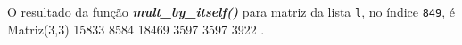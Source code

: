 \documentclass[12pt,varwidth=16cm,border=1pt]{standalone}
\begin{document}
O resultado da função \textbf{\textit{mult\_by\_itself()}} para matriz da lista \verb+l+, no índice \verb+849+, é \newline Matriz(3,3)
  15833 8584 
  18469 3597 
  3597 3922 .

\questiomfalse
\end{document}
